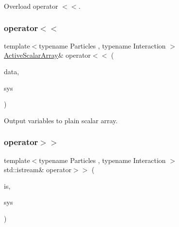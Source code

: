 Overload operator $<$$<$. 

\mbox{\label{classparticle_system_a2516759aad9a8eb2bfeb0ceabbf3c071}} 
\subsubsection{\texorpdfstring{operator$<$$<$}{operator<<}\hspace{0.1cm}{\footnotesize\ttfamily [2/2]}}
{\footnotesize\ttfamily template$<$typename Particles , typename Interaction $>$ \\
\mbox{\hyperlink{classparticle_system_adeaa416917733980026d138dfde2f7ab}{Active\+Scalar\+Array}}\& operator$<$$<$ (\begin{DoxyParamCaption}\item[{\mbox{\hyperlink{classparticle_system_adeaa416917733980026d138dfde2f7ab}{Active\+Scalar\+Array}} \&}]{data,  }\item[{const \mbox{\hyperlink{classparticle_system}{particle\+System}}$<$ Particles, Interaction $>$ \&}]{sys }\end{DoxyParamCaption})\hspace{0.3cm}{\ttfamily [friend]}}



Output variables to plain scalar array. 

\mbox{\label{classparticle_system_a7c8a355dd7f5c30b6f54c341bf672d10}} 
\subsubsection{\texorpdfstring{operator$>$$>$}{operator>>}\hspace{0.1cm}{\footnotesize\ttfamily [1/2]}}
{\footnotesize\ttfamily template$<$typename Particles , typename Interaction $>$ \\
std\+::istream\& operator$>$$>$ (\begin{DoxyParamCaption}\item[{std\+::istream \&}]{is,  }\item[{\mbox{\hyperlink{classparticle_system}{particle\+System}}$<$ Particles, Interaction $>$ \&}]{sys }\end{DoxyParamCaption})\hspace{0.3cm}{\ttfamily [friend]}}



